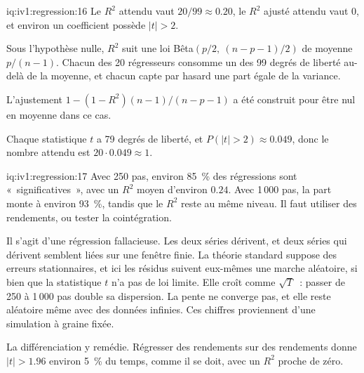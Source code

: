 \begin{solution}{iq:iv1:regression:16}
Le $R^2$ attendu vaut $20/99 \approx 0.20$, le $R^2$ ajusté attendu vaut 0, et environ un coefficient possède $|t| > 2$.

Sous l'hypothèse nulle, $R^2$ suit une loi Bêta$(p/2,\ (n - p - 1)/2)$ de moyenne $p/(n - 1)$. Chacun des 20 régresseurs consomme un des 99 degrés de liberté au-delà de la moyenne, et chacun capte par hasard une part égale de la variance.

L'ajustement $1 - (1 - R^2)(n - 1)/(n - p - 1)$ a été construit pour être nul en moyenne dans ce cas.

Chaque statistique $t$ a 79 degrés de liberté, et $P(|t| > 2) \approx 0.049$, donc le nombre attendu est $20 \cdot 0.049 \approx 1$.

\end{solution}

\begin{solution}{iq:iv1:regression:17}
Avec 250 pas, environ 85~\% des régressions sont «~significatives~», avec un $R^2$ moyen d'environ $0.24$. Avec 1\,000 pas, la part monte à environ 93~\%, tandis que le $R^2$ reste au même niveau. Il faut utiliser des rendements, ou tester la cointégration.

Il s'agit d'une régression fallacieuse. Les deux séries dérivent, et deux séries qui dérivent semblent liées sur une fenêtre finie. La théorie standard suppose des erreurs stationnaires, et ici les résidus suivent eux-mêmes une marche aléatoire, si bien que la statistique $t$ n'a pas de loi limite. Elle croît comme $\sqrt{T}$~: passer de 250 à 1\,000 pas double sa dispersion. La pente ne converge pas, et elle reste aléatoire même avec des données infinies. Ces chiffres proviennent d'une simulation à graine fixée.

La différenciation y remédie. Régresser des rendements sur des rendements donne $|t| > 1.96$ environ 5~\% du temps, comme il se doit, avec un $R^2$ proche de zéro.

\end{solution}


